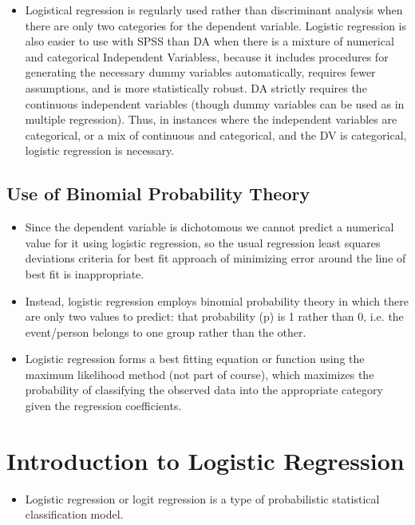 \documentclass[a4paper,12pt]{article}
\begin{document}
{\begin{itemize}
	\item 	Logistical regression is regularly used rather than discriminant analysis when there are only two categories
	for the dependent variable. Logistic regression is also easier to use with SPSS than DA when
	there is a mixture of numerical and categorical Independent Variabless, because it includes procedures for
	generating the necessary dummy variables automatically, requires fewer assumptions, and
	is more statistically robust. DA strictly requires the continuous independent variables  (though dummy variables can be used as in multiple regression). Thus, in instances where
	the independent variables are categorical, or a mix of continuous and categorical, and the
	DV is categorical, logistic regression is necessary.
\end{itemize}


\subsection{Use of Binomial Probability Theory}
\begin{itemize}
	\item Since the dependent variable is dichotomous we cannot predict a numerical value for it
	using logistic regression, so the usual regression least squares deviations criteria for best fit
	approach of minimizing error around the line of best fit is inappropriate.
	
	\item 	Instead, logistic regression employs binomial probability theory in which there are only two values to
	predict: that probability (p) is 1 rather than 0, i.e. the event/person belongs to one group
	rather than the other.
	\item Logistic regression forms a best fitting equation or function using the
	maximum likelihood method (not part of course), which maximizes the probability of classifying the observed
	data into the appropriate category given the regression coefficients.
\end{itemize}


\section{Introduction to Logistic Regression}
\begin{itemize}
	\item Logistic regression or logit regression is a type of probabilistic statistical classification model.
	

\end{itemize}}
\end{document}
